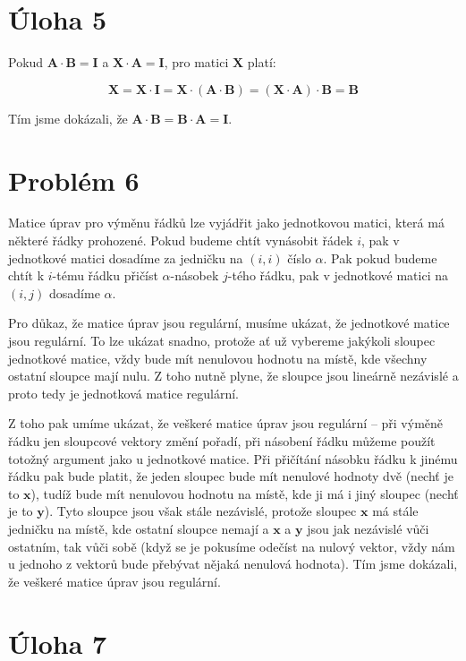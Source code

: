 \documentclass{fkssolpub}
\begin{document}
\section{Úloha 5}

Pokud $\mathbf{A} \cdot \mathbf{B} = \mathbf{I}$ a $\mathbf{X} \cdot \mathbf{A} = \mathbf{I}$, pro matici $\mathbf{X}$ platí:

\[
	\mathbf{X} = \mathbf{X} \cdot \mathbf{I} = \mathbf{X} \cdot (\mathbf{A} \cdot \mathbf{B}) = (\mathbf{X} \cdot \mathbf{A}) \cdot \mathbf{B} = \mathbf{B}
\]

Tím jsme dokázali, že $\mathbf{A} \cdot \mathbf{B} = \mathbf{B} \cdot \mathbf{A} = \mathbf{I}$.

\section{Problém 6}

Matice úprav pro výměnu řádků lze vyjádřit jako jednotkovou matici, která má některé řádky prohozené. Pokud budeme chtít vynásobit řádek $i$, pak v jednotkové matici dosadíme za jedničku na $(i,i)$ číslo $\alpha$. Pak pokud budeme chtít k $i$-tému řádku přičíst $\alpha$-násobek $j$-tého řádku, pak v jednotkové matici na $(i,j)$ dosadíme $\alpha$.

Pro důkaz, že matice úprav jsou regulární, musíme ukázat, že jednotkové matice jsou regulární. To lze ukázat snadno, protože ať už vybereme jakýkoli sloupec jednotkové matice, vždy bude mít nenulovou hodnotu na místě, kde všechny ostatní sloupce mají nulu. Z toho nutně plyne, že sloupce jsou lineárně nezávislé a proto tedy je jednotková matice regulární.

Z toho pak umíme ukázat, že veškeré matice úprav jsou regulární -- při výměně řádku jen sloupcové vektory změní pořadí, při násobení řádku můžeme použít totožný argument jako u jednotkové matice. Při přičítání násobku řádku k jinému řádku pak bude platit, že jeden sloupec bude mít nenulové hodnoty dvě (nechť je to $\mathbf{x}$), tudíž bude mít nenulovou hodnotu na místě, kde ji má i jiný sloupec (nechť je to $\mathbf{y}$). Tyto sloupce jsou však stále nezávislé, protože sloupec $\mathbf{x}$ má stále jedničku na místě, kde ostatní sloupce nemají a $\mathbf{x}$ a $\mathbf{y}$ jsou jak nezávislé vůči ostatním, tak vůči sobě (když se je pokusíme odečíst na nulový vektor, vždy nám u jednoho z vektorů bude přebývat nějaká nenulová hodnota). Tím jsme dokázali, že veškeré matice úprav jsou regulární.

\section{Úloha 7}
\end{document}
